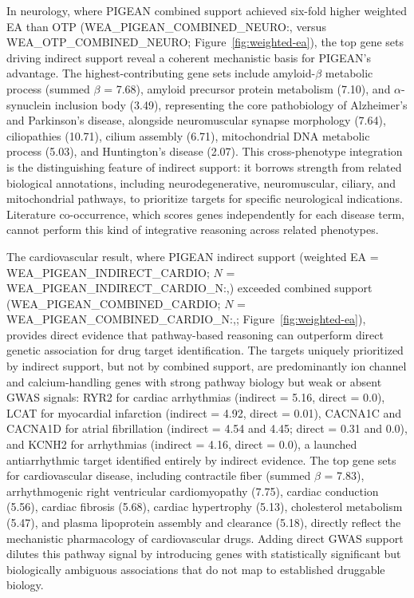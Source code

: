In neurology, where PIGEAN combined support achieved six-fold higher weighted EA than OTP ({{WEA_PIGEAN_COMBINED_NEURO:,}} versus {{WEA_OTP_COMBINED_NEURO}}; Figure~\ref{fig:weighted-ea}), the top gene sets driving indirect support reveal a coherent mechanistic basis for PIGEAN's advantage. The highest-contributing gene sets include amyloid-$\beta$ metabolic process (summed $\beta$ = 7.68), amyloid precursor protein metabolism (7.10), and $\alpha$-synuclein inclusion body (3.49), representing the core pathobiology of Alzheimer's and Parkinson's disease, alongside neuromuscular synapse morphology (7.64), ciliopathies (10.71), cilium assembly (6.71), mitochondrial DNA metabolic process (5.03), and Huntington's disease (2.07). This cross-phenotype integration is the distinguishing feature of indirect support: it borrows strength from related biological annotations, including neurodegenerative, neuromuscular, ciliary, and mitochondrial pathways, to prioritize targets for specific neurological indications. Literature co-occurrence, which scores genes independently for each disease term, cannot perform this kind of integrative reasoning across related phenotypes.

The cardiovascular result, where PIGEAN indirect support (weighted EA = {{WEA_PIGEAN_INDIRECT_CARDIO}}; $N$ = {{WEA_PIGEAN_INDIRECT_CARDIO_N:,}}) exceeded combined support ({{WEA_PIGEAN_COMBINED_CARDIO}}; $N$ = {{WEA_PIGEAN_COMBINED_CARDIO_N:,}}; Figure~\ref{fig:weighted-ea}), provides direct evidence that pathway-based reasoning can outperform direct genetic association for drug target identification. The targets uniquely prioritized by indirect support, but not by combined support, are predominantly ion channel and calcium-handling genes with strong pathway biology but weak or absent GWAS signals: RYR2 for cardiac arrhythmias (indirect = 5.16, direct = 0.0), LCAT for myocardial infarction (indirect = 4.92, direct = 0.01), CACNA1C and CACNA1D for atrial fibrillation (indirect = 4.54 and 4.45; direct = 0.31 and 0.0), and KCNH2 for arrhythmias (indirect = 4.16, direct = 0.0), a launched antiarrhythmic target identified entirely by indirect evidence. The top gene sets for cardiovascular disease, including contractile fiber (summed $\beta$ = 7.83), arrhythmogenic right ventricular cardiomyopathy (7.75), cardiac conduction (5.56), cardiac fibrosis (5.68), cardiac hypertrophy (5.13), cholesterol metabolism (5.47), and plasma lipoprotein assembly and clearance (5.18), directly reflect the mechanistic pharmacology of cardiovascular drugs. Adding direct GWAS support dilutes this pathway signal by introducing genes with statistically significant but biologically ambiguous associations that do not map to established druggable biology.

